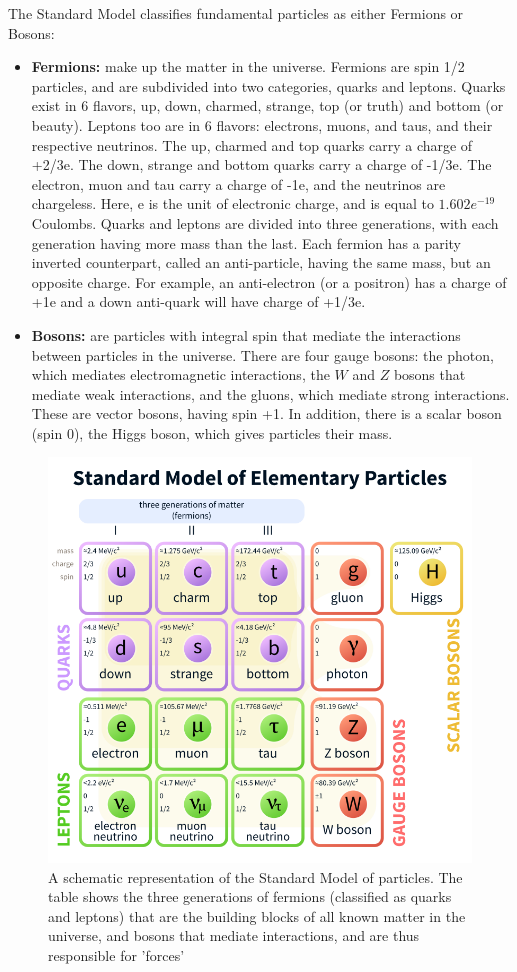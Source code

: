 \documentclass[11pt,a4paper]{report}
\begin{document}
The Standard Model classifies fundamental particles as either Fermions or Bosons:
\begin{itemize}
\item \textbf{Fermions:} make up the matter in the universe. Fermions are spin 1/2 particles, and are subdivided into two categories, quarks and leptons. Quarks exist in 6 flavors, up, down, charmed, strange, top (or truth) and bottom (or beauty). Leptons too are in 6 flavors: electrons, muons, and taus, and their respective neutrinos. The up, charmed and top quarks carry a charge of +2/3e. The down, strange and bottom quarks carry a charge of -1/3e. The electron, muon and tau carry a charge of -1e, and the neutrinos are chargeless. Here, e is the unit of electronic charge, and is equal to $1.602e^{-19}$ Coulombs. Quarks and leptons are divided into three generations, with each generation having more mass than the last. Each fermion has a parity inverted counterpart, called an anti-particle, having the same mass, but an opposite charge. For example, an anti-electron (or a positron) has a charge of +1e and a down anti-quark will have charge of +1/3e.
\item \textbf{Bosons:} are particles with integral spin that mediate the interactions between particles in the universe. There are four gauge bosons: the photon, which mediates electromagnetic interactions, the $W$ and $Z$ bosons that mediate weak interactions, and the gluons, which mediate strong interactions. These are vector bosons, having spin +1. In addition, there is a scalar boson (spin 0), the Higgs boson, which gives particles their mass.
\end{itemize}
\begin{figure}[H]
\centering
\includegraphics[width=0.7\linewidth]{standard_model.png}
\caption{A schematic representation of the Standard Model\cite{SM} of particles. The table shows the three generations of fermions (classified as quarks and leptons) that are the building blocks of all known matter in the universe, and bosons that mediate interactions, and are thus responsible for 'forces'}
\label{fig:SM}
\end{figure}
\end{document}
